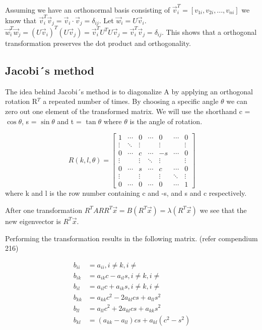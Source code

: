 Assuming we have an orthonormal basis consisting of $\vec{v}_i^T = [v_{1i},
v_{2i}, ... , v_{ni}]$ we know that $\vec{v}_i^T \vec{v}_j = \vec{v}_i \cdot
\vec{v}_j = \delta_{ij}$. Let $\vec{w}_i = U\vec{v}_i$. $\vec{w}_i^T \vec{w}_j =
(U\vec{v}_i)^T(U\vec{v}_j) = \vec{v}_i^T U^T U \vec{v}_j = \vec{v}_i^T \vec{v}_j
= \delta_{ij}$. This shows that a orthogonal transformation preserves the dot
product and orthogonality.

\subsection{Jacobi´s method}

The idea behind Jacobi´s method is to diagonalize A by applying an orthogonal
rotation R$^T$ a repeated number of times. By choosing a specific angle $\theta$
we can zero out one element of the transformed matrix. We will use the shorthand
c = $\cos{\theta}$, s = $\sin{\theta}$ and t = $\tan{\theta}$ where $\theta$ is
the angle of rotation.


$$R(k,l,\theta) =
\begin{bmatrix}
  1       & \cdots  & 0       & \cdots  & 0       & \cdots  & 0 \\
  \vdots  & \ddots  &  \vdots &         & \vdots  &         & \vdots \\
  0       & \cdots  & c       & \cdots  & -s      & \cdots  & 0 \\
  \vdots  &         & \vdots  & \ddots  & \vdots  &         & \vdots\\
  0       & \cdots  & s       & \cdots  & c       & \cdots  & 0\\
  \vdots  &         & \vdots  &         &  \vdots & \ddots  & \vdots\\
  0       & \cdots  & 0       & \cdots  & 0       & \cdots  & 1
\end{bmatrix}
$$
where k and l is the row number containing c and -s, and s and c respectively.


After one transformation $R^T A R R^T \vec{x} = B (R^T \vec{x}) = \lambda (R^T
\vec{x})$ we see that the new eigenvector is $R^T\vec{x}$.

Performing the transformation results in the following matrix.
(refer compendium 216)

\begin{align*}
  b_{ii} &= a_{ii}, i \neq k, i \neq \\
  b_{ik} &= a_{ik}c - a_{il}s, i \neq k, i \neq \\
  b_{il} &= a_{il}c + a_{ik}s, i \neq k, i \neq \\
  b_{kk} &= a_{kk}c^2 - 2a_{kl}cs + a_{ll}s^2 \\
  b_{ll} &= a_{ll}c^2 + 2a_{kl}cs + a_{kk}s^2 \\
  b_{kl} &= (a_{kk}- a_{ll})cs + a_{kl}(c^2 - s^2)
\end{align*}

